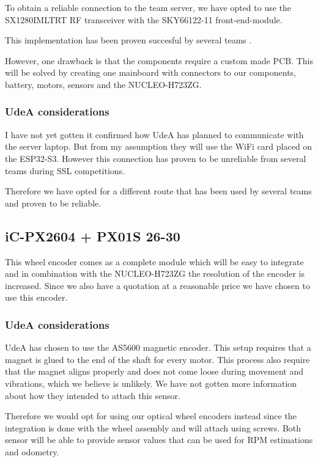 \documentclass[a4paper,8pt]{article}
\begin{document}
  To obtain a reliable connection to the team server, we have opted to
  use the SX1280IMLTRT RF transceiver with the SKY66122-11
  front-end-module.

  This implementation has been proven succesful by several teams \cite{ryllExtendedTeamDescription}\cite{barretoRoboIMEIgnitingInnovation}.

  However, one drawback is that the components require a custom made
  PCB. This will be solved by creating one mainboard with connectors to
  our components, battery, motors, sensors and the NUCLEO-H723ZG. 

  \subsubsection{UdeA considerations}

  I have not yet gotten it confirmed how UdeA has planned to communicate with the server laptop. But from my assumption they will use the WiFi card placed on the ESP32-S3. However this connection has proven to be unreliable from several teams during SSL competitions.

  Therefore we have opted for a different route that has been used by several teams and proven to be reliable.

  \subsection{iC-PX2604 + PX01S 26-30}

  This wheel encoder comes as a complete module which will be easy to
  integrate and in combination with the NUCLEO-H723ZG the resolution of
  the encoder is increased. Since we also have a quotation at a
  reasonable price we have chosen to use this encoder.

  \subsubsection{UdeA considerations}

  UdeA has chosen to use the AS5600 magnetic encoder. This setup requires that a magnet is glued to the end of the shaft for every motor. This process also require that the magnet aligns properly and does not come loose during movement and vibrations, which we believe is unlikely. We have not gotten more information about how they intended to attach this sensor.

  Therefore we would opt for using our optical wheel encoders instead since the integration is done with the wheel assembly and will attach using screws. Both sensor will be able to provide sensor values that can be used for RPM estimations and odometry.
\end{document}
